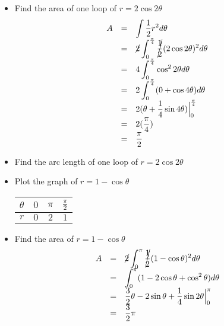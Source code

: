 \begin{eg}
\begin{itemize}
\item Find the area of one loop of \(r = 2 \cos 2 \theta\)
\[\begin{array}{rcl}
A & = & \displaystyle \int \frac{1}{2} r^2 d\theta\\
& = & \displaystyle \cancel{2} \int^{\frac{\pi}{4}}_0 \cancel{\frac{1}{2}} (2 \cos 2 \theta)^2 d\theta\\
& = & \displaystyle 4 \int^{\frac{\pi}{4}}_0 \cos^2 2\theta d\theta\\
& = & \displaystyle 2 \int^{\frac{\pi}{4}}_0 (0 + \cos 4\theta) d\theta\\
& = & \displaystyle 2 (\theta + \frac{1}{4} \sin 4\theta) \Big|^{\frac{\pi}{4}}_0\\
& = & \displaystyle 2 (\frac{\pi}{4})\\
& = & \displaystyle \frac{\pi}{2}
\end{array}\]
\item Find the arc length of one loop of \(r = 2 \cos 2 \theta\)
\end{itemize}
\end{eg}
\begin{eg}[Cardioid]
\begin{itemize}
\item Plot the graph of \(r = 1 - \cos \theta\)
\begin{center}
\begin{tabular}{c|c|c|c}
\(\theta\) & \(0\) & \(\pi\) & \(\displaystyle \frac{\pi}{2}\)\\\hline
\(r\) & \(0\) & \(2\) & \(1\)
\end{tabular}
\end{center}
\item Find the area of \(r = 1 - \cos \theta\)
\[\begin{array}{rcl}
A & = & \displaystyle \cancel{2} \int^{\pi}_0 \cancel{\frac{1}{2}} (1 - \cos \theta)^2 d\theta\\
& = & \displaystyle \int^{\pi}_0 (1 - 2 \cos \theta + \cos^2 \theta) d\theta\\
& = & \displaystyle \frac{3}{2} \theta - 2 \sin \theta + \frac{1}{4} \sin 2 \theta \Big|^{\pi}_0\\
& = & \displaystyle \frac{3}{2} \pi
\end{array}\]
\end{itemize}
\end{eg}
